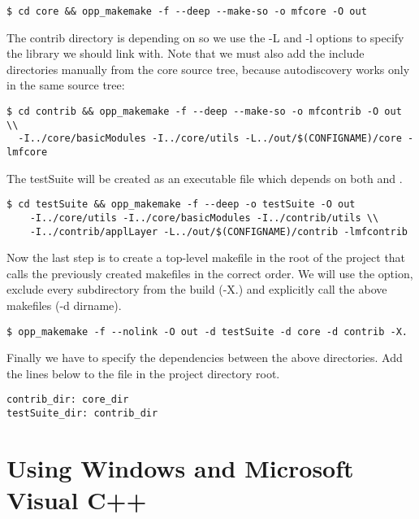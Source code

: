 \begin{verbatim}
$ cd core && opp_makemake -f --deep --make-so -o mfcore -O out
\end{verbatim}

The contrib directory is depending on  so we use the -L and -l options
to specify the library we should link with. Note that we must also add
the include directories manually from the core source tree, because autodiscovery works only
in the same source tree:

\begin{verbatim}
$ cd contrib && opp_makemake -f --deep --make-so -o mfcontrib -O out \\
  -I../core/basicModules -I../core/utils -L../out/$(CONFIGNAME)/core -lmfcore
\end{verbatim}

The testSuite will be created as an executable file which depends on both
 and .

\begin{verbatim}
$ cd testSuite && opp_makemake -f --deep -o testSuite -O out
    -I../core/utils -I../core/basicModules -I../contrib/utils \\
    -I../contrib/applLayer -L../out/$(CONFIGNAME)/contrib -lmfcontrib
\end{verbatim}

Now the last step is to create a top-level makefile in the root of the project that
calls the previously created makefiles in the correct order. We will use the
 option, exclude every subdirectory from the build (-X.) and explicitly call
the above makefiles (-d dirname).

\begin{verbatim}
$ opp_makemake -f --nolink -O out -d testSuite -d core -d contrib -X.
\end{verbatim}

Finally we have to specify the dependencies between the above directories. Add the lines below
to the  file in the project directory root.

\begin{verbatim}
contrib_dir: core_dir
testSuite_dir: contrib_dir
\end{verbatim}

\ifcommercial
\section{Using Windows and Microsoft Visual C++}

